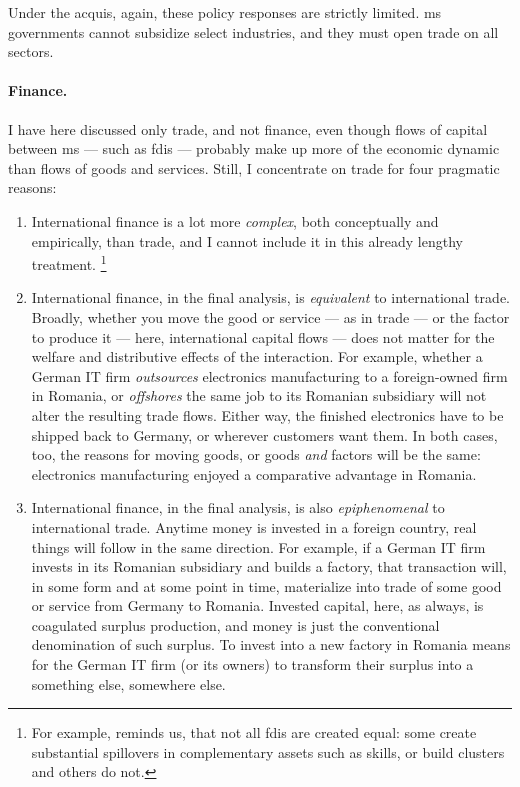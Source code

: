 Under the acquis, again, these policy responses are strictly limited.
\gls{ms} governments cannot subsidize select industries, and they must open trade on all sectors.

\paragraph{Finance.}
I have here discussed only trade, and not finance, even though flows of capital between \gls{ms} --- such as \glspl{fdi} --- probably make up more of the economic dynamic than flows of goods and services.
Still, I concentrate on trade for four pragmatic reasons:
\begin{enumerate}
	\item International finance is a lot more \emph{complex}, both conceptually and empirically, than trade, and I cannot include it in this already lengthy treatment.
	\footnote{
		For example, \cite{Narula2005} reminds us, that not all \glspl{fdi} are created equal:
		some create substantial spillovers in complementary assets such as skills, or build clusters and others do not.
	}
	\item International finance, in the final analysis, is \emph{equivalent} to international trade.
	Broadly, whether you move the good or service --- as in trade --- or the factor to produce it --- here, international capital flows --- does not matter for the welfare and distributive effects of the interaction.
	For example, whether a German IT firm \emph{outsources} electronics manufacturing to a foreign-owned firm in Romania, or \emph{offshores} the same job to its Romanian subsidiary will not alter the resulting trade flows.
	Either way, the finished electronics have to be shipped back to Germany, or wherever customers want them.
	In both cases, too, the reasons for moving goods, or goods \emph{and} factors will be the same:
	electronics manufacturing enjoyed a comparative advantage in Romania.
	\item International finance, in the final analysis, is also \emph{epiphenomenal} to international trade.
	Anytime money is invested in a foreign country, real things will follow in the same direction.
	For example, if a German IT firm invests in its Romanian subsidiary and builds a factory, that transaction will, in some form and at some point in time, materialize into trade of some good or service from Germany to Romania.
	Invested capital, here, as always, is coagulated surplus production, and money is just the conventional denomination of such surplus.
	To invest into a new factory in Romania means for the German IT firm (or its owners) to transform their surplus into a something else, somewhere else.

\end{enumerate}
